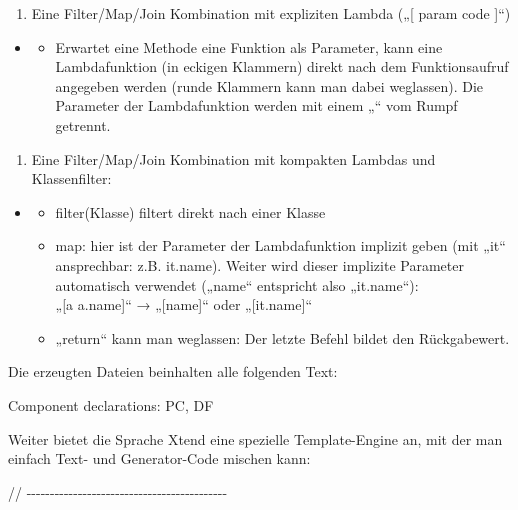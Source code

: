 \documentclass[]{article}
\providecommand{\tightlist}{%
  \setlength{\itemsep}{0pt}\setlength{\parskip}{0pt}}
\begin{document}
\begin{enumerate}
\def\labelenumi{\arabic{enumi}.}
\tightlist
\item
  Eine Filter/Map/Join Kombination mit expliziten Lambda („{[} param
  \textbar{} code {]}``)
\end{enumerate}

\begin{itemize}
\item
  \begin{itemize}
  \tightlist
  \item
    Erwartet eine Methode eine Funktion als Parameter, kann eine
    Lambdafunktion (in eckigen Klammern) direkt nach dem Funktionsaufruf
    angegeben werden (runde Klammern kann man dabei weglassen). Die
    Parameter der Lambdafunktion werden mit einem „\textbar{}`` vom
    Rumpf getrennt.
  \end{itemize}
\end{itemize}

\begin{enumerate}
\def\labelenumi{\arabic{enumi}.}
\tightlist
\item
  Eine Filter/Map/Join Kombination mit kompakten Lambdas und
  Klassenfilter: 
\end{enumerate}

\begin{itemize}
\item
  \begin{itemize}
  \tightlist
  \item
    filter(Klasse) filtert direkt nach einer Klasse
  \item
    map: hier ist der Parameter der Lambdafunktion implizit geben (mit
    „it`` ansprechbar: z.B. it.name). Weiter wird dieser implizite
    Parameter automatisch verwendet („name`` entspricht also
    „it.name``):\\
    „{[}a \textbar{} a.name{]}`` → „{[}name{]}`` oder „{[}it.name{]}``
  \item
    „return`` kann man weglassen: Der letzte Befehl bildet den
    Rückgabewert.
  \end{itemize}
\end{itemize}

Die erzeugten Dateien beinhalten alle folgenden Text:

Component declarations: PC, DF

Weiter bietet die Sprache Xtend eine spezielle Template-Engine an, mit
der man einfach Text- und Generator-Code mischen kann:

//
-\/-\/-\/-\/-\/-\/-\/-\/-\/-\/-\/-\/-\/-\/-\/-\/-\/-\/-\/-\/-\/-\/-\/-\/-\/-\/-\/-\/-\/-\/-\/-\/-\/-\/-\/-\/-\/-\/-\/-\/-\/-\/-
\end{document}
